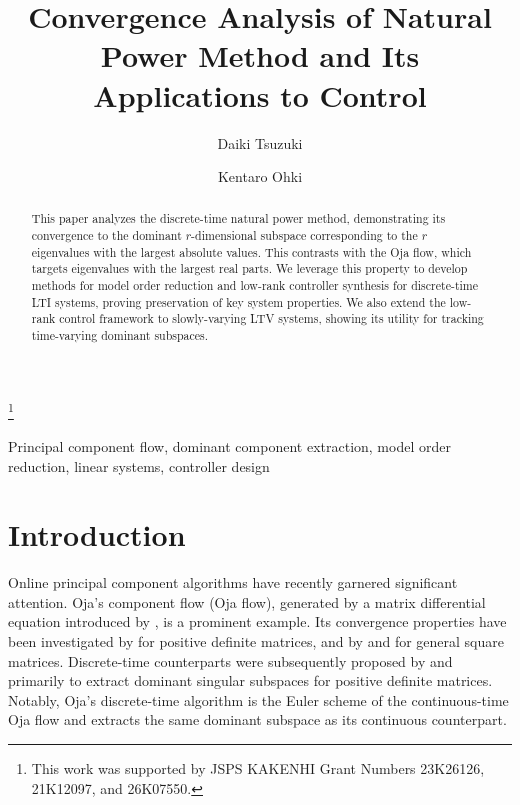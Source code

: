 \documentclass{ifacconf}
\begin{document}
\begin{frontmatter}

\title{Convergence Analysis of Natural Power Method and Its Applications to Control} 

\thanks[footnoteinfo]{This work was supported by JSPS KAKENHI Grant Numbers 23K26126, 21K12097, and 26K07550.}

\author[First]{Daiki Tsuzuki} 
\author[Second]{Kentaro Ohki} 

\address[First]{Graduate School of Informatics, Kyoto University, Yoshida-Honmachi, Sakyo-ku, Kyoto, Japan}
\address[Second]{Department of Applied Computer Engineering, Tokai University, Kitakaname 4-1-1, Hiratsuka, Kanagawa, Japan. (e-mail: ohki@tokai.ac.jp)}

\begin{abstract}                %
This paper analyzes the discrete-time natural power method, demonstrating its convergence to the dominant $r$-dimensional subspace corresponding to the $r$ eigenvalues with the largest absolute values. This contrasts with the Oja flow, which targets eigenvalues with the largest real parts. We leverage this property to develop methods for model order reduction and low-rank controller synthesis for discrete-time LTI systems, proving preservation of key system properties. We also extend the low-rank control framework to slowly-varying LTV systems, showing its utility for tracking time-varying dominant subspaces.
\end{abstract}

\begin{keyword}
Principal component flow, dominant component extraction, model order reduction, linear systems, controller design
\end{keyword}

\end{frontmatter}


	
\section{Introduction}
Online principal component algorithms have recently garnered significant attention. 
Oja's component flow (Oja flow), generated by a matrix differential equation introduced by \cite{oja1982simplified,oja1985stochastic}, is a prominent example. Its convergence properties have been investigated by \cite{chen1998global} for positive definite matrices, and by \cite{kuo2025asymptotic} and \cite{TsuzukiOhki2025global} for general square matrices. 
Discrete-time counterparts were subsequently proposed by \cite{oja1989neural} and \cite{hua1999new} primarily to extract dominant singular subspaces for positive definite matrices. 
Notably, Oja's discrete-time algorithm is the Euler scheme of the continuous-time Oja flow and extracts the same dominant subspace as its continuous counterpart.
\end{document}
